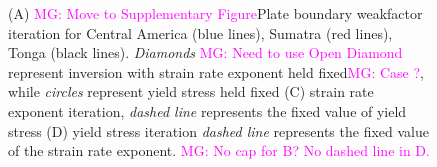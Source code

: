 \documentclass[12pt]{article}
\newcommand{\mgnote}[1]{\textcolor{magenta}{MG: #1}}
\begin{document}
{ %
\begin{figure}[H]
\centering
\hspace{-0.4cm}
\hspace{-0.1cm}
\hspace{-0.2cm}
\hspace{-0.2cm}
\caption{(A) \mgnote{Move to Supplementary Figure}Plate boundary weakfactor iteration for Central America (blue lines), Sumatra (red lines), Tonga (black lines). \textit{Diamonds} \mgnote{Need to use Open Diamond} represent inversion with strain rate exponent held fixed\mgnote{Case ?}, while \textit{circles} represent yield stress held fixed (C) strain rate exponent iteration, \textit{dashed line} represents the fixed value of yield stress (D) yield stress iteration \textit{dashed line} represents the fixed value of the strain rate exponent.
\mgnote{No cap for B? No dashed line in D.}}
\label{fig:model_convergence}
\end{figure}



}
\end{document}
